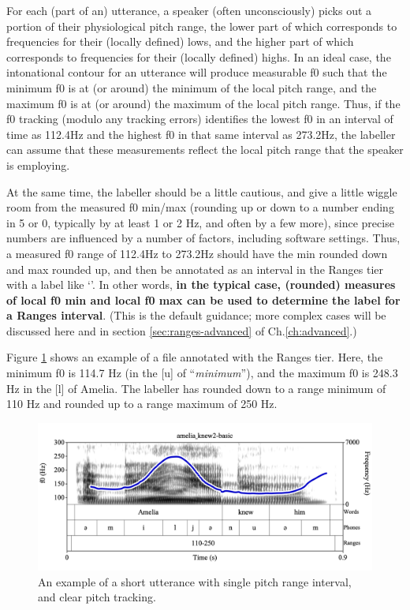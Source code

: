 \documentclass[11pt, twoside]{memoir}
\def\textlabel#1{{\relsize{-.5}\fontspec[Mapping=tex-text]{Roboto Mono}{#1}}}
\def\langtext#1{\textit{#1}}
\begin{document}
For each (part of an) utterance, a speaker (often unconsciously) picks out a portion of their physiological pitch range, the lower part of which corresponds to frequencies for their (locally defined) lows, and the higher part of which corresponds to frequencies for their (locally defined) highs. In an ideal case, the intonational contour for an utterance will produce measurable f0 such that the minimum f0 is at (or around) the minimum of the local pitch range, and the maximum f0 is at (or around) the maximum of the local pitch range. Thus, if the f0 tracking (modulo any tracking errors) identifies the lowest f0 in an interval of time as 112.4Hz and the highest f0 in that same interval as 273.2Hz, the labeller can assume that these measurements reflect the local pitch range that the speaker is employing.

At the same time, the labeller should be a little cautious, and give a little wiggle room from the measured f0 min\slash max (rounding up or down to a number ending in 5 or 0, typically by at least 1 or 2 Hz, and often by a few more), since precise numbers are influenced by a number of factors, including software settings. Thus, a measured f0 range of 112.4Hz to 273.2Hz should have the min rounded down and max rounded up, and then be annotated as an interval in the Ranges tier with a label like ‘\textlabel{110-280}’. In other words, \textbf{in the typical case, (rounded) measures of local f0 min and local f0 max can be used to determine the label for a Ranges interval}. (This is the default guidance; more complex cases will be discussed here and in section \ref{sec:ranges-advanced} of Ch.\ref{ch:advanced}.)

Figure \ref{fig:amelia-knew2 Ranges basic} shows an example of a file annotated with the Ranges tier. Here, the minimum f0 is 114.7 Hz (in the [u] of “\langtext{minimum}”), and the maximum f0 is 248.3 Hz in the [l] of Amelia. The labeller has rounded down to a range minimum of 110 Hz and rounded up to a range maximum of 250 Hz.

\begin{figure}[H]
\centering
%
\includegraphics[width=.875\linewidth]{Ranges-amelia_knew2-basic.png}
%
\caption{An example of a short utterance with single pitch range interval, and clear pitch tracking.%
\label{fig:amelia-knew2 Ranges basic}%
%
}
\end{figure}
\end{document}
